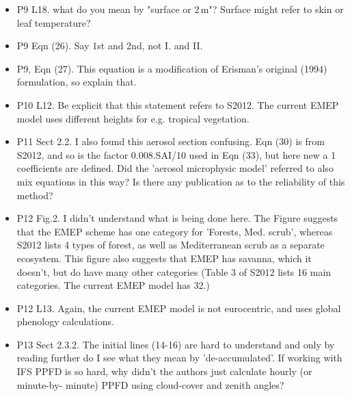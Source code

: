 \documentclass{scrartcl}
\begin{document}
\begin{itemize}
{phenology for non-European areas, because of such difficulties with tabulations.)}
\item {\color{blue}P9 L18. what do you mean by "surface or 2\,m"? Surface might refer to skin or
leaf temperature?}
\item {\color{blue}P9 Eqn (26). Say 1st and 2nd, not I. and II.}
\item {\color{blue}P9, Eqn (27). This equation is a modification of Erisman’s original (1994) formulation, so explain that.}
\item {\color{blue}P10 L12. Be explicit that this statement refers to S2012. The current EMEP
model uses different heights for e.g. tropical vegetation.}
\item {\color{blue}P11 Sect 2.2. I also found this aerosol section confusing. Eqn (30) is from S2012,
and so is the factor 0.008.SAI/10 used in Eqn (33), but here new a 1 coefficients
are defined. Did the ’aerosol microphysic model’ referred to also mix equations
in this way? Is there any publication as to the reliability of this method?}
\item {\color{blue}P12 Fig.2. I didn’t understand what is being done here. The Figure suggests that
the EMEP scheme has one category for ’Forests, Med. scrub’, whereas S2012
lists 4 types of forest, as well as Mediterranean scrub as a separate ecosystem.
This figure also suggests that EMEP has savanna, which it doesn’t, but do have
many other categories (Table 3 of S2012 lists 16 main categories. The current
EMEP model has 32.)}
\item {\color{blue}P12 L13. Again, the current EMEP model is not eurocentric, and uses global
phenology calculations.}
\item {\color{blue}P13 Sect 2.3.2. The initial lines (14-16) are hard to understand and only by
reading further do I see what they mean by ’de-accumulated’. If working with
IFS PPFD is so hard, why didn’t the authors just calculate hourly (or minute-by-
minute) PPFD using cloud-cover and zenith angles?}

\end{itemize}
\newpage
\end{document}
